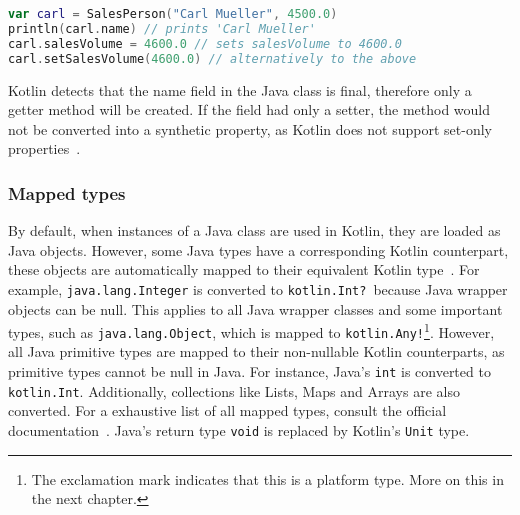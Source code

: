\documentclass[a4paper,11pt]{article}
\begin{document}
\begin{lstlisting}[language=Kotlin, title={Access a Salesman instance in Kotlin}]
var carl = SalesPerson("Carl Mueller", 4500.0)
println(carl.name) // prints 'Carl Mueller'
carl.salesVolume = 4600.0 // sets salesVolume to 4600.0
carl.setSalesVolume(4600.0) // alternatively to the above
\end{lstlisting}

Kotlin detects that the name field in the Java class is final, therefore only a getter method will be created. If the field had only a setter, the method would not be converted into a synthetic property, as Kotlin does not support set-only properties~\cite{interop-synthetic-property}.

\subsubsection{Mapped types}
By default, when instances of a Java class are used in Kotlin, they are loaded as Java objects. However, some Java types have a corresponding Kotlin counterpart, these objects are automatically mapped to their equivalent Kotlin type~\cite{interop-mapped-types}. For example, \texttt{java.lang.\allowbreak Integer} is converted to \texttt{kotlin.Int?}\ because Java wrapper objects can be null. This applies to all Java wrapper classes and some important types, such as \texttt{java.lang.Object}, which is mapped to \texttt{kotlin.Any!}\footnote{The exclamation mark indicates that this is a platform type. More on this in the next chapter.}. However, all Java primitive types are mapped to their non-nullable Kotlin counterparts, as primitive types cannot be null in Java. For instance, Java's \texttt{int} is converted to \texttt{kotlin.Int}. Additionally, collections like Lists, Maps and Arrays are also converted. For a exhaustive list of all mapped types, consult the official documentation~\cite{interop-mapped-types}. Java's return type \texttt{void} is replaced by Kotlin's \texttt{Unit} type.
\end{document}
